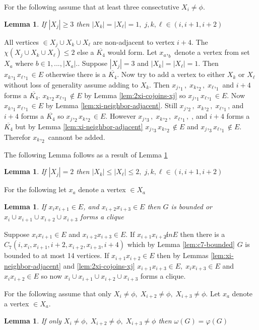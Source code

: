 \documentclass[12pt]{article}
\newtheorem{Lemma}[Theorem]{Lemma}
\begin{document}
For the following assume that at least three consectutive $X_i \neq \phi$.
\begin{Lemma}\label{lem:three-consecutive-xi}
If $|X_j| \geq 3$ then $|X_k| = |X_\ell| = 1,\; j,k,\ell \in ({i,i+1,i+2})$
\end{Lemma}
 All vertices $\in X_j \cup X_k \cup X_\ell$ are non-adjacent to vertex $i+4$. The $\chi(X_j \cup X_k \cup X_\ell) \leq 2$ else a $\overline{K_4}$ would form. Let $x_a,_b$ denote a vertex from set $X_a$ where $b \in {1,..., |X_a|}.$. Suppose $|X_j| = 3$ and $|X_k| = |X_\ell| = 1$.  Then $x_k,_1x_\ell,_1 \in E$ otherwise there is a $\overline{K_4}$. Now try to add a vertex to either $X_k$ or $X_\ell$ without loss of generality assume adding to $X_k$. Then $x_j,_1,\;x_k,_2,\;x_\ell,_1$ and $i+4$ forms a $\overline{K_4}$. $x_k,_2x_\ell,_1 \not \in E$ by Lemma \ref{lem:2xi-cojoins-xj}  so $x_j,_1x_\ell,_1 \in E$. Now $x_k,_1x_\ell,_1 \in E$ by Lemma \ref{lem:xi-neighbor-adjacent}. Still $x_j,_2,\;x_k,_2,\;x_\ell,_1$, and $i+4$ forms a $\overline{K_4}$ so $x_j,_2x_k,_2 \in E$. However $x_j,_3,\;x_k,_2,\;x_\ell,_1,\;$, and $i+4$ forms a $\overline{K_4}$ but by Lemma \ref{lem:xi-neighbor-adjacent} $x_j,_3x_k,_2 \not \in E$ and $x_j,_3x_\ell,_1 \not \in E$. Therefor $x_k,_2$ cannont be added.

The following Lemma follows as a result of Lemma \ref{lem:three-consecutive-xi}
\begin{Lemma}\label{lem:f-three-consecutive-xi}
If $|X_j| = 2$ then $|X_k| \leq |X_\ell| \leq 2,\; j,k,\ell \in ({i,i+1,i+2})$
\end{Lemma}

For the following let $x_a$ denote a vertex $\in X_a$
\begin{Lemma}\label{lem:g-bounded}
If $x_ix_{i+1} \in E$, and $x_{i+2}x_{i+3} \in E$ then $G$ is bounded or $x_i \cup x_{i+1} \cup x_{i+2} \cup x_{i+3}$ forms a clique
\end{Lemma}
 Suppose $x_ix_{i+1} \in E$ and $x_{i+2}x_{i+3} \in E$. If $x_{i+1}x_{i+2} \not in E$ then there is a $C_7 (i,x_i,x_{i+1}, i+2, x_{i+2}, x_{i+3}, i+4)$ which by Lemma \ref{lem:c7-bounded} $G$ is bounded to at most 14 vertices. If $x_{i+1}x_{i+2} \in E$ then by Lemmas \ref{lem:xi-neighbor-adjacent} and \ref{lem:2xi-cojoins-xj} $x_{i+1}x_{i+3} \in E,\; x_{i}x_{i+3} \in E$ and $x_{i}x_{i+2} \in E$ so now $x_i \cup x_{i+1} \cup x_{i+2} \cup x_{i+3}$ forms a clique.


For the following assume that only $X_i \neq \phi,\; X_{i+2} \neq \phi,\; X_{i+3} \neq \phi$. Let $x_a$ denote a vertex $\in X_a$.
\begin{Lemma}\label{lem:coloring-xi-xi2-xi3}
If only $X_i \neq \phi,\; X_{i+2} \neq \phi,\; X_{i+3} \neq \phi$ then $ \omega(G) = \varphi(G)$
\end{Lemma}
\end{document}
